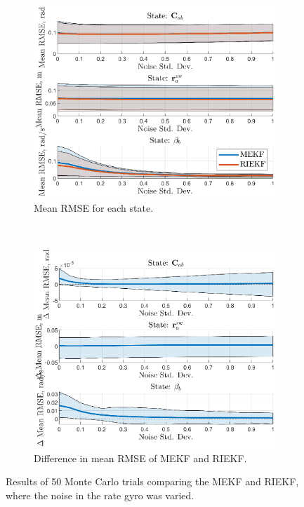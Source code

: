 \begin{figure}
	\centering
	\begin{subfigure}[b]{0.5\textwidth}
		\includegraphics[width=\textwidth]{figs/se3/bias/comp_noise_rmse_state_Bias_Gyro_R.eps}
		\caption{Mean RMSE for each state.}
	\end{subfigure}
	~
	\begin{subfigure}[b]{0.5\textwidth}
		\includegraphics[width=\textwidth]{figs/se3/bias/comp_noise_diff_state_Bias_Gyro_R.eps}
		\caption{Difference in mean RMSE of MEKF and RIEKF.}
	\end{subfigure}
	\caption[Results comparing the MEKF-R and RIEKF varying rate gyro noise.]{Results of 50 Monte Carlo trials comparing the MEKF and RIEKF, where the noise in the rate gyro was varied.}
	\label{fig:se3_comp_bias_gyro}
\end{figure} 


